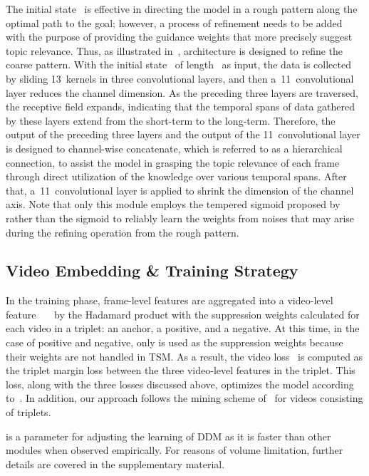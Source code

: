 \documentclass[10pt,twocolumn,letterpaper]{article}
\begin{document}
            The initial state~ is effective in directing the model in a rough pattern along the optimal path to the goal; however, a process of refinement needs to be added with the purpose of providing the guidance weights that more precisely suggest topic relevance. Thus, as illustrated in~, architecture is designed to refine the coarse pattern. With the initial state~ of length~ as input, the data is collected by sliding 13~kernels in three convolutional layers, and then a~11~convolutional layer reduces the channel dimension. As the preceding three layers are traversed, the receptive field expands, indicating that the temporal spans of data gathered by these layers extend from the short-term to the long-term. Therefore, the output of the preceding three layers and the output of the 11~convolutional layer is designed to channel-wise concatenate, which is referred to as a hierarchical connection, to assist the model in grasping the topic relevance of each frame through direct utilization of the knowledge over various temporal spans. After that, a~11~convolutional layer is applied to shrink the dimension of the channel axis. Note that only this module employs the tempered sigmoid proposed by~\cite{papernot2021tempered} rather than the sigmoid to reliably learn the weights from noises that may arise during the refining operation from the rough pattern.
  
    \subsection{Video Embedding \& Training Strategy}
        
        In the training phase, frame-level features are aggregated into a video-level feature~~~ by the Hadamard product with the suppression weights  calculated for each video in a triplet: an anchor, a positive, and a negative. At this time, in the case of positive and negative, only  is used as the suppression weights  because their weights are not handled in TSM. As a result, the video loss~ is computed as the triplet margin loss between the three video-level features in the triplet. This loss, along with the three losses discussed above, optimizes the model according to~. In addition, our approach follows the mining scheme of~\cite{kordopatis2019visil} for videos consisting of triplets.
                 
        \noindent  is a parameter for adjusting the learning of DDM as it is faster than other modules when observed empirically. For reasons of volume limitation, further details are covered in the supplementary material.
        
\end{document}
